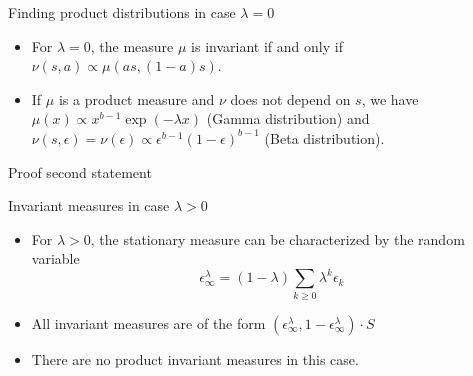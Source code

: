 \documentclass[9pt, handout]{beamer}
\begin{document}
\begin{frame}{Finding product distributions in case $\lambda = 0$}
\begin{itemize}
    \item For $\lambda = 0$, the measure $\mu$ is invariant if and only if $\nu(s, a) \propto \mu(as, (1-a)s)$.
    \item If $\mu$ is a product measure and $\nu$ does not depend on $s$, we have $\mu(x) \propto x^{b-1} \exp(-\lambda x)$ (Gamma distribution) and $\nu(s, \epsilon) = \nu(\epsilon) \propto \epsilon^{b-1}(1-\epsilon)^{b-1}$ (Beta distribution).
\end{itemize}
\end{frame}


\begin{frame}{Proof second statement}
\end{frame}


\begin{frame}{Invariant measures in case $\lambda > 0$}
\begin{itemize}
    \item For $\lambda > 0$, the stationary measure can be characterized by the random variable
        \[
            \epsilon_{\infty}^{\lambda} = (1-\lambda)\sum_{k \ge 0} \lambda^k \epsilon_k
        \]
    \item All invariant measures are of the form $(\epsilon_{\infty}^{\lambda}, 1 - \epsilon_{\infty}^{\lambda}) \cdot S$
    \item There are no product invariant measures in this case.
\end{itemize}
\end{frame}
\end{document}
